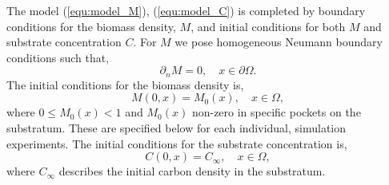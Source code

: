 The model (\ref{equ:model_M}), (\ref{equ:model_C}) is completed by boundary conditions for the biomass density, $M$, and initial conditions for both $M$ and substrate concentration $C$.
For $M$ we pose homogeneous Neumann boundary conditions such that,
\begin{equation} 
  \partial_n M = 0, \quad x \in \partial \Omega.
\end{equation}
The initial conditions for the biomass density is,
\begin{equation}
  M(0,x) = M_0(x), \quad x \in \Omega,
\end{equation}
where $0 \le M_0(x) < 1$ and $M_0(x)$ non-zero in specific pockets on the substratum. 
These are specified below for each individual, simulation experiments.
The initial conditions for the substrate concentration is,
\begin{equation}
  C(0,x) = C_{\infty}, \quad x \in \Omega,
\end{equation}
where $C_{\infty}$ describes the initial carbon density in the substratum.

